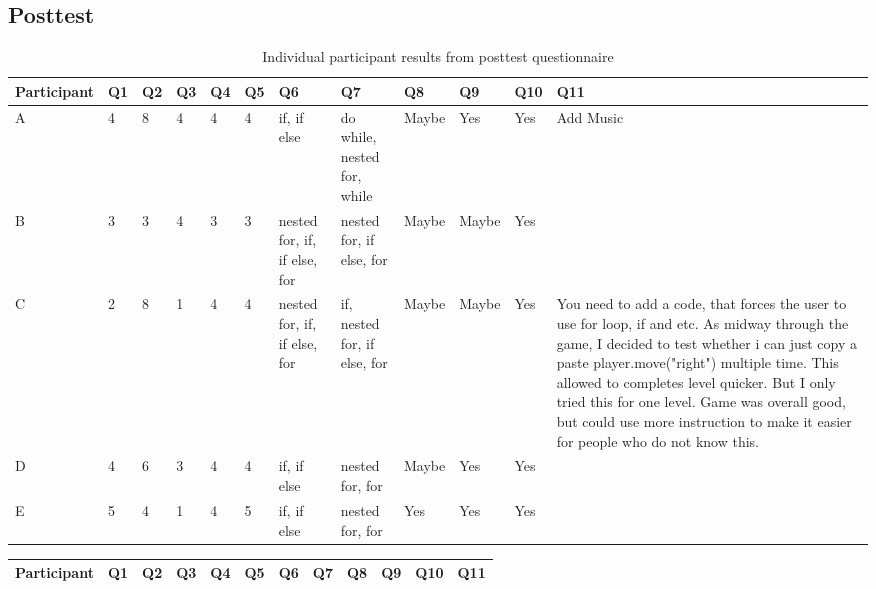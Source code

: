 \documentclass[a4paper,11.5pt]{report}
\numberwithin{figure}{section}
\numberwithin{table}{section}
\numberwithin{equation}{section}
\numberwithin{equation}{section}
\begin{document}
\begin{landscape}

\section{Posttest}



\begin{table}[H]
\centering
\caption{Individual participant results from posttest questionnaire}
\label{tab:pretestresults}
\begin{tabular}{|l|l|l|l|l|l| p{2cm} | p{2cm} | p{1cm} | p{1cm} | p{2cm} | p{7cm}|} 
 \hline        Participant & Q1 & Q2 & Q3 & Q4 & Q5 & Q6 & Q7 &Q8 &Q9 & Q10&Q11 \\ \hline

A & 4&	8&	4&	4&	4&	if, if else	&do while, nested for, while	&Maybe&	Yes&	Yes&	Add Music
\\ \hline
B&3&	3&	4&	3&	3&	nested for, if, if else, for	&nested for, if else, for	&Maybe&	Maybe&	Yes	&
\\ \hline
C&2&	8&	1&	4&	4&	nested for, if, if else, for&	if, nested for, if else, for&	Maybe&	Maybe&	Yes&	You need to add a code, that forces the user to use for loop, if and etc. As midway through the game, I decided to test whether i can just copy a paste player.move("right") multiple time. This allowed to completes level quicker. But I only tried this for one level. Game was overall good, but could use more instruction to make it easier for people who do not know this.
\\ \hline
D&4&	6&	3&	4&	4&	if, if else&	nested for, for&	Maybe&	Yes&	Yes	&
\\ \hline
E&5&	4&	1&	4&	5&	if, if else&	nested for, for&	Yes&	Yes&	Yes	&
\\ \hline

\end{tabular}
\end{table}




\begin{table}[H]
\centering
\begin{tabular}{|l|l|l|l|l|l| p{2cm} | p{2cm} | p{1cm} | p{1cm} | p{2cm} | p{7cm}|} 
 \hline        Participant & Q1 & Q2 & Q3 & Q4 & Q5 & Q6 & Q7 &Q8 &Q9 & Q10&Q11 \\ \hline
 

\end{tabular}
\end{table}
\end{landscape}
\end{document}
